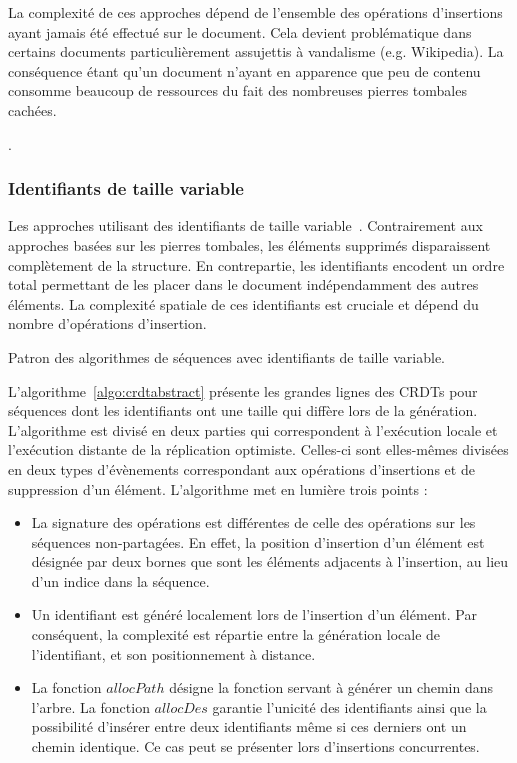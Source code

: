 La complexité de ces approches dépend de l'ensemble des opérations d'insertions
ayant jamais été effectué sur le document. Cela devient problématique dans
certains documents particulièrement assujettis à vandalisme (e.g. Wikipedia). La
conséquence étant qu'un document n'ayant en apparence que peu de contenu
consomme beaucoup de ressources du fait des nombreuses pierres tombales cachées.

.

\subsubsection{Identifiants de taille variable}

Les approches utilisant des identifiants de taille
variable~\cite{preguica2009commutative, andre2013supporting,
  weiss2009logoot}. Contrairement aux approches basées sur les pierres tombales,
les éléments supprimés disparaissent complètement de la structure. En
contrepartie, les identifiants encodent un ordre total permettant de les placer
dans le document indépendamment des autres éléments. La complexité spatiale de
ces identifiants est cruciale et dépend du nombre d'opérations d'insertion.

\begin{algorithm}
  
  \caption{\label{algo:crdtabstract} Patron des algorithmes de séquences avec
    identifiants de taille variable.}
\end{algorithm}

L'algorithme~\ref{algo:crdtabstract} présente les grandes lignes des CRDTs pour
séquences dont les identifiants ont une taille qui diffère lors de la
génération. L'algorithme est divisé en deux parties qui correspondent à
l'exécution locale et l'exécution distante de la réplication
optimiste. Celles-ci sont elles-mêmes divisées en deux types d'évènements
correspondant aux opérations d'insertions et de suppression d'un
élément. L'algorithme met en lumière trois points :
\begin{itemize}
\item La signature des opérations est différentes de celle des opérations sur
  les séquences non-partagées. En effet, la position d'insertion d'un élément est
  désignée par deux bornes que sont les éléments adjacents à l'insertion, au lieu
  d'un indice dans la séquence.
\item Un identifiant est généré localement lors de l'insertion d'un élément. Par
  conséquent, la complexité est répartie entre la génération locale de
  l'identifiant, et son positionnement à distance.
\item La fonction $allocPath$ désigne la fonction servant à générer un chemin
  dans l'arbre. La fonction $allocDes$ garantie l'unicité des identifiants ainsi
  que la possibilité d'insérer entre deux identifiants même si ces derniers ont
  un chemin identique.  Ce cas peut se présenter lors d'insertions concurrentes.
\end{itemize}


